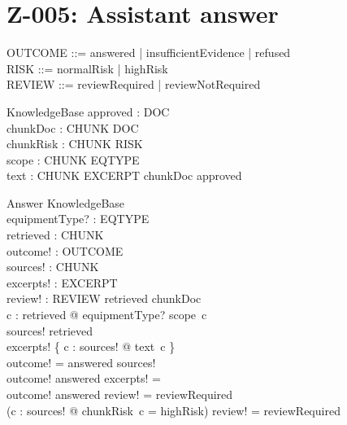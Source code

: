 \documentclass{article}
\begin{document}
\section*{Z-005: Assistant answer}

\begin{zed}
\end{zed}

\begin{zed}
  OUTCOME ::= answered | insufficientEvidence | refused \\
  RISK ::= normalRisk | highRisk \\
  REVIEW ::= reviewRequired | reviewNotRequired
\end{zed}

\begin{schema}{KnowledgeBase}
  approved : \finset DOC \\
  chunkDoc : CHUNK \pfun DOC \\
  chunkRisk : CHUNK \fun RISK \\
  scope : CHUNK \fun \finset EQTYPE \\
  text : CHUNK \fun \finset EXCERPT
\where
  \ran chunkDoc \subseteq approved
\end{schema}

\begin{schema}{Answer}
  KnowledgeBase \\
  equipmentType? : EQTYPE \\
  retrieved : \finset CHUNK \\
  outcome! : OUTCOME \\
  sources! : \finset CHUNK \\
  excerpts! : \finset EXCERPT \\
  review! : REVIEW
\where
  retrieved \subseteq \dom chunkDoc \\
  \forall c : retrieved @ equipmentType? \in scope~c \\
  sources! \subseteq retrieved \\
  excerpts! \subseteq \bigcup \{ c : sources! @ text~c \} \\
  outcome! = answered \iff sources! \neq \emptyset \\
  outcome! \neq answered \implies excerpts! = \emptyset \\
  outcome! \neq answered \implies review! = reviewRequired \\
  (\exists c : sources! @ chunkRisk~c = highRisk) \implies review! = reviewRequired
\end{schema}
\end{document}
